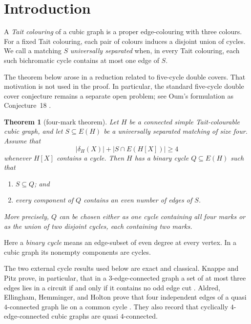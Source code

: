 \documentclass[11pt]{article}
\newtheorem{theorem}{Theorem}[section]
\theoremstyle{definition}
\theoremstyle{remark}
\newcommand{\cut}{\delta}
\begin{document}
\section{Introduction}

A \emph{Tait colouring} of a cubic graph is a proper edge-colouring with
three colours.  For a fixed Tait colouring, each pair of colours induces
a disjoint union of cycles.  We call a matching \(S\)
\emph{universally separated} when, in every Tait colouring, each such
bichromatic cycle contains at most one edge of \(S\).

The theorem below arose in a reduction related to five-cycle double
covers.  That motivation is not used in the proof.  In particular, the
standard five-cycle double cover conjecture remains a separate open
problem; see Oum's formulation as Conjecture~18
\cite[Section~9.1]{oum2026}.

\begin{theorem}[four-mark theorem]\label{thm:main}
Let \(H\) be a connected simple Tait-colourable cubic graph, and let
\(S\subseteq E(H)\) be a universally separated matching of size four.
Assume that
\begin{equation}
 |\cut_H(X)|+|S\cap E(H[X])|\ge4                 \tag{M}
\end{equation}
whenever \(H[X]\) contains a cycle.  Then \(H\) has a binary cycle
\(Q\subseteq E(H)\) such that
\begin{enumerate}
  \item \(S\subseteq Q\); and
  \item every component of \(Q\) contains an even number of edges of
        \(S\).
\end{enumerate}
More precisely, \(Q\) can be chosen either as one cycle containing all
four marks or as the union of two disjoint cycles, each containing two
marks.
\end{theorem}

Here a \emph{binary cycle} means an edge-subset of even degree at every
vertex.  In a cubic graph its nonempty components are cycles.

The two external cycle results used below are exact and classical.
Knappe and Pitz prove, in particular, that in a \(3\)-edge-connected
graph a set of at most three edges lies in a circuit if and only if it
contains no odd edge cut \cite[Fact~5.4]{knappe2020}.  Aldred,
Ellingham, Hemminger, and Holton prove that four independent edges of a
quasi \(4\)-connected graph lie on a common cycle
\cite[Theorem~3.3]{aldred1997}.  They also record that cyclically
\(4\)-edge-connected cubic graphs are quasi \(4\)-connected.
\end{document}
